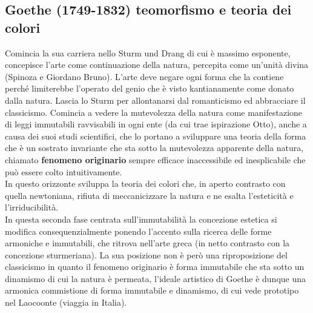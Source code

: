 \documentclass[10pt,a4paper]{article}
\begin{document}
\subsection{Goethe (1749-1832) teomorfismo e teoria dei colori}
Comincia la sua carriera nello Sturm und Drang di cui è massimo esponente, concepisce l'arte come continuazione della natura, percepita come un'unità divina (Spinoza e Giordano Bruno). L'arte deve negare ogni forma che la contiene perché limiterebbe l'operato del genio che è visto kantianamente come donato dalla natura. Lascia lo Sturm per allontanarsi dal romanticismo ed abbracciare il classicismo. Comincia a vedere la mutevolezza della natura come manifestazione di leggi immutabili ravvisabili in ogni ente (da cui trae ispirazione Otto), anche a causa dei suoi studi scientifici, che lo portano a sviluppare una teoria della forma che è un sostrato invariante che sta sotto la mutevolezza apparente della natura, chiamato \textbf{fenomeno originario} sempre efficace inaccessibile ed inesplicabile che può essere colto intuitivamente.\\
In questo orizzonte sviluppa la teoria dei colori che, in aperto contrasto con quella newtoniana, rifiuta di meccanicizzare la natura e ne esalta l'esteticità e l'irriducibilità.\\
In questa seconda fase centrata sull'immutabilità la concezione estetica si modifica consequenzialmente ponendo l'accento sulla ricerca delle forme armoniche e immutabili, che ritrova nell'arte greca (in netto contrasto con la concezione sturmeriana). La sua posizione non è però una riproposizione del classicismo in quanto il fenomeno originario è forma immutabile che sta sotto un dinamismo di cui la natura è permeata, l'ideale artistico di Goethe è dunque una armonica commistione di forma immutabile e dinamismo, di cui vede prototipo nel Laocoonte (viaggia in Italia). 
\end{document}
